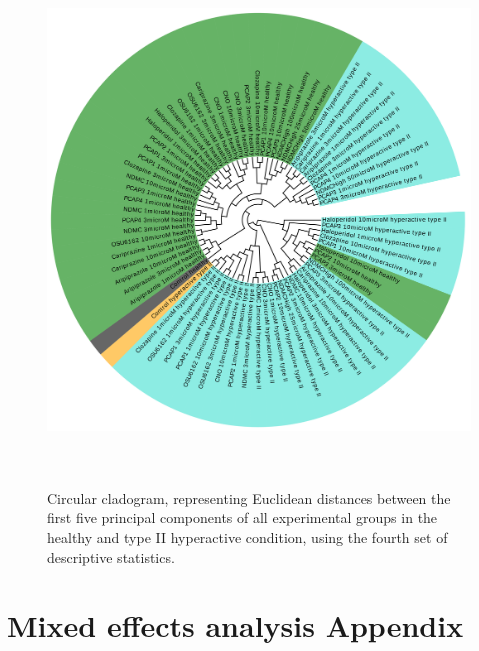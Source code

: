 \documentclass[a4paper,12pt]{article}
\begin{document}
\begin{figure}[h!]
\begin{center}
\includegraphics[width=14cm,height=14cm]{DarkPTZ_set4_PCA_tree_A.png}
\caption{Circular cladogram, representing Euclidean distances between the first five principal components of all experimental groups in the healthy and type II hyperactive condition, using the fourth set of descriptive statistics.}
\end{center}
\end{figure}
\section{Mixed effects analysis Appendix}
\end{document}
